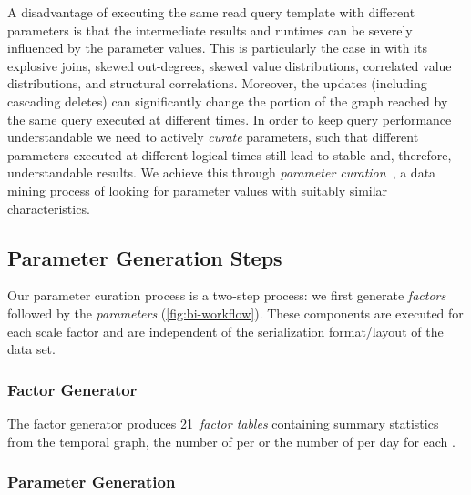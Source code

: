 A disadvantage of executing the same read query template with different parameters is that the intermediate results and runtimes can be severely influenced by the parameter values.
This is particularly the case in \snbbi with its explosive joins, skewed out-degrees, skewed value distributions, correlated value distributions, and structural correlations.
Moreover, the updates (including cascading deletes) can significantly change the portion of the graph reached by the same query executed at different times. %
In order to keep query performance understandable we need to actively {\em curate} parameters, such that different parameters executed at different logical times %
still lead to stable and, therefore, understandable results.
We achieve this through \emph{parameter curation}~\cite{DBLP:conf/tpctc/GubichevB14,DBLP:conf/sigmod/ErlingALCGPPB15}, a data mining process of looking for parameter values with suitably similar characteristics.

\subsection{Parameter Generation Steps}
\label{sec:parameter-curation-method}

Our parameter curation process is a two-step process:
we first generate \emph{factors} followed by the \emph{parameters} (\autoref{fig:bi-workflow}).
These components are executed for each scale factor and are independent of the serialization format/layout of the data set.

\subsubsection{Factor Generator}
The factor generator produces 21~\emph{factor tables} containing summary statistics from the temporal graph,
\eg
the number of \tPersons per \tCity
or
the number of \tMessages per day for each \tTag.


\subsubsection{Parameter Generation}
\label{sec:parameter-generation-query}

